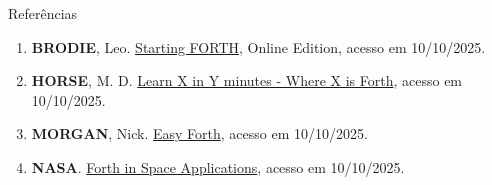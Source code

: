 \begin{frame}[fragile]{Referências}

    \begin{enumerate}
        \item \textbf{BRODIE}, Leo. \href{https://www.forth.com/starting-forth/}{Starting FORTH}, Online Edition, acesso em 10/10/2025.

        \item \textbf{HORSE}, M. D. \href{https://learnxinyminutes.com/forth/}{Learn X in Y minutes - Where X is Forth}, acesso em 10/10/2025.

        \item \textbf{MORGAN}, Nick. \href{https://skilldrick.github.io/easyforth/#introduction}{Easy Forth}, acesso em 10/10/2025.

        \item \textbf{NASA}. \href{https://www.forth.com/resources/space-applications/}{Forth in Space Applications}, acesso em 10/10/2025.


    \end{enumerate}

\end{frame}
